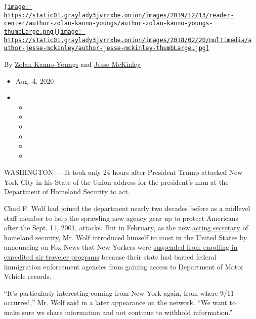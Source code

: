 \href{https://www.nytimes3xbfgragh.onion/by/zolan-kanno-youngs}{\texttt{[image: https://static01.graylady3jvrrxbe.onion/images/2019/12/13/reader-center/author-zolan-kanno-youngs/author-zolan-kanno-youngs-thumbLarge.png]}}\href{https://www.nytimes3xbfgragh.onion/by/jesse-mckinley}{\texttt{[image: https://static01.graylady3jvrrxbe.onion/images/2018/02/20/multimedia/author-jesse-mckinley/author-jesse-mckinley-thumbLarge.jpg]}}

By \href{https://www.nytimes3xbfgragh.onion/by/zolan-kanno-youngs}{Zolan
Kanno-Youngs} and
\href{https://www.nytimes3xbfgragh.onion/by/jesse-mckinley}{Jesse
McKinley}

\begin{itemize}
\item
  Aug. 4, 2020
\item
  \begin{itemize}
  \item
  \item
  \item
  \item
  \item
  \item
  \end{itemize}
\end{itemize}

WASHINGTON --- It took only 24 hours after President Trump attacked New
York City in his State of the Union address for the president's man at
the Department of Homeland Security to act.

Chad F. Wolf had joined the department nearly two decades before as a
midlevel staff member to help the sprawling new agency gear up to
protect Americans after the Sept. 11, 2001, attacks. But in February, as
the new
\href{https://www.nytimes3xbfgragh.onion/2019/11/01/us/politics/trump-chad-wolf-dhs.html}{acting
secretary} of homeland security, Mr. Wolf introduced himself to most in
the United States by announcing on Fox News that New Yorkers were
\href{https://www.nytimes3xbfgragh.onion/2020/02/06/us/politics/dhs-new-york-global-entry.html}{suspended
from enrolling in expedited air traveler programs} because their state
had barred federal immigration enforcement agencies from gaining access
to Department of Motor Vehicle records.

``It's particularly interesting coming from New York again, from where
9/11 occurred,'' Mr. Wolf said in a later appearance on the network.
``We want to make sure we share information and not continue to withhold
information.''


